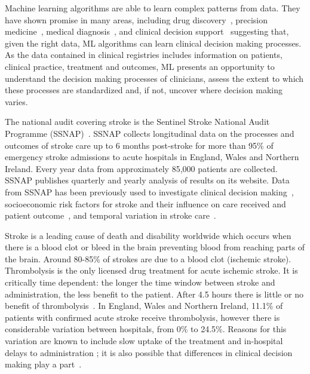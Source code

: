 \documentclass[12pt,a4paper, pdftex]{elsarticle}
\begin{document}
 Machine learning algorithms are able to learn complex patterns from data. They have shown promise in many areas, including drug discovery~\cite{ekins2019exploiting}, precision medicine~\cite{cammarota2020gut}, medical diagnosis~\cite{olsen2020clinical, lee2020machine}, and clinical decision support~\cite{peiffer2020machine, buchlak2020machine} suggesting that, given the right data, ML algorithms can learn clinical decision making processes. As the data contained in clinical registries includes information on patients, clinical practice, treatment and outcomes, ML presents an opportunity to understand the decision making processes of clinicians, assess the extent to which these processes are standardized and, if not, uncover where decision making varies.

%

The national audit covering stroke is the Sentinel Stroke National Audit Programme (SSNAP)~\cite{party2015sentinel}. SSNAP collects longitudinal data on the processes and outcomes of stroke care up to 6 months post-stroke for more than 95\% of emergency stroke admissions to acute hospitals in England, Wales and Northern Ireland. Every year data from approximately 85,000 patients are collected. SSNAP publishes quarterly and yearly analysis of results on its website. Data from SSNAP has been previously used to investigate clinical decision making~\cite{parry2016care}, socioeconomic risk factors for stroke and their influence on care received and patient outcome~\cite{bray2018socioeconomic}, and temporal variation in stroke care~\cite{bray2016weekly}.

Stroke is a leading cause of death and disability worldwide which occurs when there is a blood clot or bleed in the brain preventing blood from reaching parts of the brain. Around 80-85\% of strokes are due to a blood clot (ischemic stroke). Thrombolysis is the only licensed drug treatment for acute ischemic stroke. It is critically time dependent: the longer the time window between stroke and administration, the less benefit to the patient. After 4.5 hours there is little or no benefit of thrombolysis~\cite{emberson2014effect}. In England, Wales and Northern Ireland, 11.1\% of patients with confirmed acute stroke receive thrombolysis, however there is considerable variation between hospitals, from 0\% to 24.5\%. Reasons for this variation are known to include slow uptake of the treatment and in-hospital delays to administration \cite{carter-jones_stroke_2011}; it is also possible that differences in clinical decision making play a part~\cite{de2018factors}.
\end{document}
